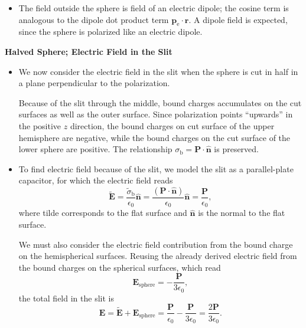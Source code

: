 \documentclass[11pt, a4paper]{article}
\renewcommand{\vec}[1]{\bm{#1}} %
\newcommand{\uvec}[1]{\hat{\vec{#1}}} %
\renewcommand{\t}[1]{\tilde{#1}} %
\renewcommand{\r}{\vec{r}}
\newcommand{\E}{\vec{E}}  %
\newcommand{\ee}{\epsilon_{0}}  %
\newcommand{\pe}{\vec{p}_{\text{e}}}  %
\renewcommand{\P}{\vec{P}}  %
\begin{document}
\begin{itemize}
	\item The field outside the sphere is field of an electric dipole; the cosine term is analogous to the dipole dot product term $ \pe \cdot \r $. A dipole field is expected, since the sphere is polarized like an electric dipole. 
	
\end{itemize}

\textbf{Halved Sphere; Electric Field in the Slit}
\begin{itemize}
	\item We now consider the electric field in the slit when the sphere is cut in half in a plane perpendicular to the polarization. 
	
	Because of the slit through the middle, bound charges accumulates on the cut surfaces as well as the outer surface. Since polarization points ``upwards'' in the positive $ z $ direction, the bound charges on cut surface of the upper hemisphere are negative, while the bound charges on the cut surface of the lower sphere are positive. The relationship $ \sigma_{\text{b}} = \P \cdot \uvec{n} $ is preserved. 
	
	\item To find electric field because of the slit, we model the slit as a parallel-plate capacitor, for which the electric field reads
	\begin{equation*}
        \t{\E} = \frac{\t{\sigma}_{\text{b}}}{\ee}\uvec{n} = \frac{(\P \cdot \uvec{n})}{\ee} \uvec{n} = \frac{\P}{\ee},
	\end{equation*}
	where tilde corresponds to the flat surface and $ \uvec{n} $ is the normal to the flat surface.
	
	We must also consider the electric field contribution from the bound charge on the hemispherical surfaces. Reusing the already derived electric field from the bound charges on the spherical surfaces, which read
	\begin{equation*}
		\E_{\text{sphere}} = - \frac{\P}{3\ee},
	\end{equation*}
	the total field in the slit is
	\begin{equation*}
		\E = \t{\E} + \E_{\text{sphere}} = \frac{\P}{\ee} - \frac{\P}{3\ee} = \frac{2\P}{3\ee}.
	\end{equation*}
\end{itemize}
\end{document}
